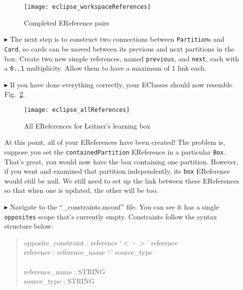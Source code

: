 \begin{itemize}
\begin{figure}[htbp]
	\centering
  \texttt{[image: eclipse\_workspaceReferences]}
	\caption{Completed EReference pairs}
	\label{fig:almostAllReferences}
\end{figure} 

\newpage

\item[$\blacktriangleright$] The next step is to construct two connections between \texttt{Partition}s and \texttt{Card}, so cards can be moved between its
previous and next partitions in the box. Create two new simple references, named \texttt{previous}, and \texttt{next}, each with a \texttt{0..1} multiplicity.
Allow them to have a maximum of 1 link each.

\vspace{0.5cm}

\item[$\blacktriangleright$] If you have done everything correctly, your EClasses should now resemble Fig.~\ref{fig:allReferences}. 

\vspace{0.5cm}

\begin{figure}[htbp]
	\centering
  \texttt{[image: eclipse\_allReferences]}
	\caption{All EReferences for Leitner's learning box}
	\label{fig:allReferences}
\end{figure} 

\clearpage

At this point, all of your EReferences have been created! The problem is, suppose you set the \texttt{containedPartition} EReference in a particular
\texttt{Box}. That's great, you would now have the box containing one partition. However, if you went and examined that partition independently, its
\texttt{box} EReference would still be null. We still need to set up the link between these EReferences so that when one is updated, the other will be too.

\vspace{0.5cm}

\item[$\blacktriangleright$] Navigate to the ``\_constraints.mconf'' file. You can see it has a single \texttt{opposites} scope that's currently empty.
Constraints follow the syntax structure below: 
{ \begin{quote} \small
	opposite\_constraint : reference `$<$ - $>$' reference \\
	reference : reference\_name `:' source\_type \\
	\\
	reference\_name : STRING \\
	source\_type : STRING \\
\end{quote} }


\end{itemize}
